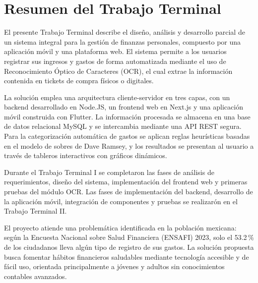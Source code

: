 \chapter*{Resumen del Trabajo Terminal}
\thispagestyle{fancy}

El presente Trabajo Terminal describe el diseño, análisis y desarrollo parcial de un sistema integral para la gestión de finanzas personales, compuesto por una aplicación móvil y una plataforma web. El sistema permite a los usuarios registrar sus ingresos y gastos de forma automatizada mediante el uso de Reconocimiento Óptico de Caracteres (OCR), el cual extrae la información contenida en tickets de compra físicos o digitales.

La solución emplea una arquitectura cliente-servidor en tres capas, con un backend desarrollado en Node.JS, un frontend web en Next.js y una aplicación móvil construida con Flutter. La información procesada se almacena en una base de datos relacional MySQL y se intercambia mediante una API REST segura. Para la categorización automática de gastos se aplican reglas heurísticas basadas en el modelo de sobres de Dave Ramsey, y los resultados se presentan al usuario a través de tableros interactivos con gráficos dinámicos.

Durante el Trabajo Terminal I se completaron las fases de análisis de requerimientos, diseño del sistema, implementación del frontend web 
y primeras pruebas del módulo OCR. Las fases de implementación del backend, desarrollo de la aplicación móvil, integración de componentes
y pruebas se realizarón en el Trabajo Terminal II.

El proyecto atiende una problemática identificada en la población mexicana: según la Encuesta Nacional sobre Salud Financiera (ENSAFI) 2023, solo el 53.2\,\% de los ciudadanos lleva algún tipo de registro de sus gastos. La solución propuesta busca fomentar hábitos financieros saludables mediante tecnología accesible y de fácil uso, orientada principalmente a jóvenes y adultos sin conocimientos contables avanzados.

\newpage
